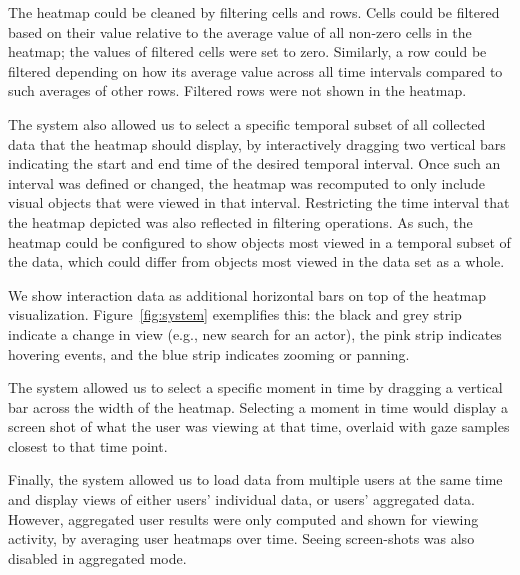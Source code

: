 The heatmap could be cleaned by filtering cells and rows. Cells could be filtered based on their value relative to the average value of all non-zero cells in the heatmap; the values of filtered cells were set to zero. Similarly, a row could be filtered depending on how its average value across all time intervals compared to such averages of other rows. Filtered rows were not shown in the heatmap. 

The system also allowed us to select a specific temporal subset of all collected data that the heatmap should display, by interactively dragging two vertical bars indicating the start and end time of the desired temporal interval. Once such an interval was defined or changed, the heatmap was recomputed to only include visual objects that were viewed in that interval. Restricting the time interval that the heatmap depicted was also reflected in filtering operations. As such, the heatmap could be configured to show objects most viewed in a temporal subset of the data, which could differ from objects most viewed in the data set as a whole.

We show interaction data as additional horizontal bars on top of the heatmap visualization. Figure~\ref{fig:system} exemplifies this: the black and grey strip indicate a change in view (e.g., new search for an actor), the pink strip indicates hovering events, and the blue strip indicates zooming or panning. 

The system allowed us to select a specific moment in time by dragging a vertical bar across the width of the heatmap. Selecting a moment in time would display a screen shot of what the user was viewing at that time, overlaid with gaze samples closest to that time point. 

Finally, the system allowed us to load data from multiple users at the same time and display views of either users' individual data, or users' aggregated data. However, aggregated user results were only computed and shown for viewing activity, by averaging user heatmaps over time. Seeing screen-shots was also disabled in aggregated mode.